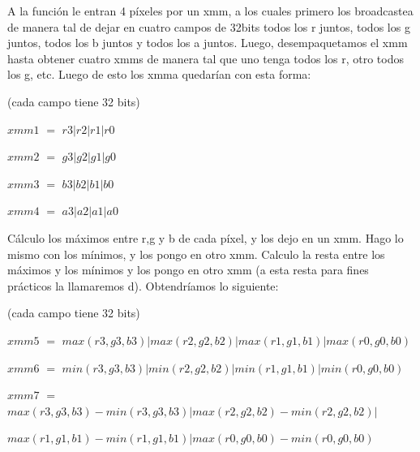 \documentclass[a4paper]{article}
\begin{document}
A la función le entran 4 píxeles por un xmm, a los cuales primero los broadcastea de manera tal de dejar en cuatro campos de 32bits todos los r juntos, todos los g juntos, todos los b juntos y todos los a juntos. Luego, desempaquetamos el xmm hasta obtener cuatro xmms de manera tal que uno tenga todos los r, otro todos los g, etc. Luego de esto los xmma quedarían con esta forma:

\vspace*{0.3cm}

(cada campo tiene 32 bits)

\vspace*{0.3cm}

 $xmm1$ $=$ $r3|r2|r1|r0$

\vspace*{0.3cm}

 $xmm2$ $=$ $g3|g2|g1|g0$

\vspace*{0.3cm}

 $xmm3$ $=$ $b3|b2|b1|b0$

\vspace*{0.3cm}

 $xmm4$ $=$ $a3|a2|a1|a0$

\vspace*{0.3cm}

Cálculo los máximos entre r,g y b de cada píxel, y los dejo en un xmm. Hago lo mismo con los mínimos, y los pongo en otro xmm. Calculo la resta entre los máximos y los mínimos y los pongo en otro xmm (a esta resta para fines prácticos la llamaremos d). Obtendríamos lo siguiente:

 \vspace*{0.3cm}

(cada campo tiene 32 bits)

\vspace*{0.3cm}

 $xmm5$ $=$ $max(r3,g3,b3)|max(r2,g2,b2)|max(r1,g1,b1)|max(r0,g0,b0)$

\vspace*{0.3cm}

 $xmm6$ $=$ $min(r3,g3,b3)|min(r2,g2,b2)|min(r1,g1,b1)|min(r0,g0,b0)$

\vspace*{0.3cm}

 $xmm7$ $=$ $max(r3,g3,b3)-min(r3,g3,b3)|max(r2,g2,b2)-min(r2,g2,b2)|$
 
 \hspace*{1.45cm}$max(r1,g1,b1)-min(r1,g1,b1)|max(r0,g0,b0)-min(r0,g0,b0)$
\end{document}
